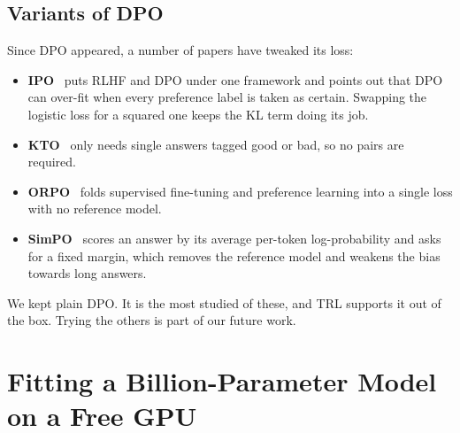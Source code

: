 \subsection{Variants of DPO}
Since DPO appeared, a number of papers have tweaked its loss:
\begin{itemize}
  \item \textbf{IPO}~\cite{azar2024ipo} puts RLHF and DPO under one framework and points out that DPO can over-fit when every preference label is taken as certain. Swapping the logistic loss for a squared one keeps the KL term doing its job.
  \item \textbf{KTO}~\cite{ethayarajh2024kto} only needs single answers tagged good or bad, so no pairs are required.
  \item \textbf{ORPO}~\cite{hong2024orpo} folds supervised fine-tuning and preference learning into a single loss with no reference model.
  \item \textbf{SimPO}~\cite{meng2024simpo} scores an answer by its average per-token log-probability and asks for a fixed margin, which removes the reference model and weakens the bias towards long answers.
\end{itemize}
We kept plain DPO. It is the most studied of these, and TRL supports it out of the box. Trying the others is part of our future work.

\section{Fitting a Billion-Parameter Model on a Free GPU}
\label{sec:lit-peft}

